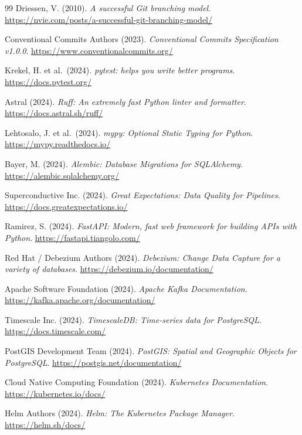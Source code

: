 \documentclass[12pt,a4paper]{report}
\theoremstyle{definition}
\theoremstyle{remark}
\begin{document}
\begin{thebibliography}{99}
  Driessen, V. (2010).
  \textit{A successful Git branching model}.
  \url{https://nvie.com/posts/a-successful-git-branching-model/}

  Conventional Commits Authors (2023).
  \textit{Conventional Commits Specification v1.0.0}.
  \url{https://www.conventionalcommits.org/}

  Krekel, H. et al.\ (2024).
  \textit{pytest: helps you write better programs}.
  \url{https://docs.pytest.org/}

  Astral (2024).
  \textit{Ruff: An extremely fast Python linter and formatter}.
  \url{https://docs.astral.sh/ruff/}

  Lehtosalo, J. et al.\ (2024).
  \textit{mypy: Optional Static Typing for Python}.
  \url{https://mypy.readthedocs.io/}

  Bayer, M. (2024).
  \textit{Alembic: Database Migrations for SQLAlchemy}.
  \url{https://alembic.sqlalchemy.org/}

  Superconductive Inc. (2024).
  \textit{Great Expectations: Data Quality for Pipelines}.
  \url{https://docs.greatexpectations.io/}

  Ramirez, S. (2024).
  \textit{FastAPI: Modern, fast web framework for building APIs with Python}.
  \url{https://fastapi.tiangolo.com/}

  Red Hat / Debezium Authors (2024).
  \textit{Debezium: Change Data Capture for a variety of databases}.
  \url{https://debezium.io/documentation/}

  Apache Software Foundation (2024).
  \textit{Apache Kafka Documentation}.
  \url{https://kafka.apache.org/documentation/}

  Timescale Inc. (2024).
  \textit{TimescaleDB: Time-series data for PostgreSQL}.
  \url{https://docs.timescale.com/}

  PostGIS Development Team (2024).
  \textit{PostGIS: Spatial and Geographic Objects for PostgreSQL}.
  \url{https://postgis.net/documentation/}

  Cloud Native Computing Foundation (2024).
  \textit{Kubernetes Documentation}.
  \url{https://kubernetes.io/docs/}

  Helm Authors (2024).
  \textit{Helm: The Kubernetes Package Manager}.
  \url{https://helm.sh/docs/}


\end{thebibliography}
\end{document}
